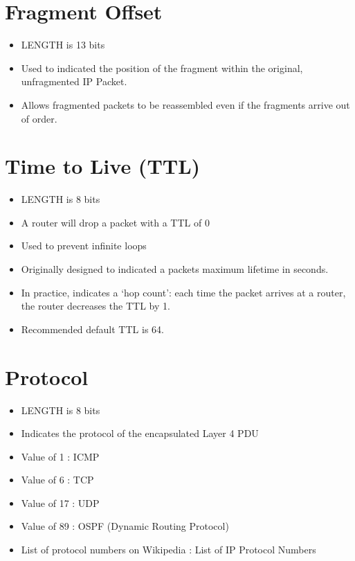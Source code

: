 \section{Fragment Offset}\label{fragment-offset}

\begin{itemize}
\tightlist
\item
  LENGTH is 13 bits
\item
  Used to indicated the position of the fragment within the original,
  unfragmented IP Packet.
\item
  Allows fragmented packets to be reassembled even if the fragments
  arrive out of order.
\end{itemize}

\section{Time to Live (TTL)}\label{time-to-live-ttl}

\begin{itemize}
\tightlist
\item
  LENGTH is 8 bits
\item
  A router will drop a packet with a TTL of 0
\item
  Used to prevent infinite loops
\item
  Originally designed to indicated a packets maximum lifetime in
  seconds.
\item
  In practice, indicates a `hop count': each time the packet arrives at
  a router, the router decreases the TTL by 1.
\item
  Recommended default TTL is 64.
\end{itemize}

\section{Protocol}\label{protocol}

\begin{itemize}
\tightlist
\item
  LENGTH is 8 bits
\item
  Indicates the protocol of the encapsulated Layer 4 PDU
\item
  Value of 1 : ICMP
\item
  Value of 6 : TCP
\item
  Value of 17 : UDP
\item
  Value of 89 : OSPF (Dynamic Routing Protocol)
\item
  List of protocol numbers on Wikipedia : List of IP Protocol Numbers
\end{itemize}

